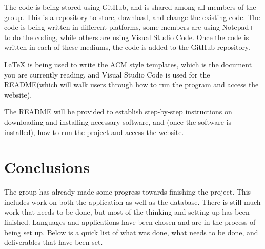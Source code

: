 \documentclass{Group6_Phase1}
\begin{document}
The code is being stored using GitHub, and is shared among all members of the group. This is a repository to store, download, and change the existing code. The code is being written in different platforms, some members are using Notepad++ to do the coding, while others are using Visual Studio Code. Once the code is written in each of these mediums, the code is added to the GitHub repository. 

LaTeX is being used to write the ACM style templates, which is the document you are currently reading, and Visual Studio Code is used for the README(which will walk users through how to run the program and access the website).

The README will be provided to establish step-by-step instructions on downloading and installing necessary software, and (once the software is installed), how to run the project and access the website. 


\section{Conclusions}
The group has already made some progress towards finishing the project. This includes work on both the application as well as the database. There is still much work that needs to be done, but most of the thinking and setting up has been finished. Languages and applications have been chosen and are in the process of being set up. Below is a quick list of what was done, what needs to be done, and deliverables that have been set.  
\end{document}

